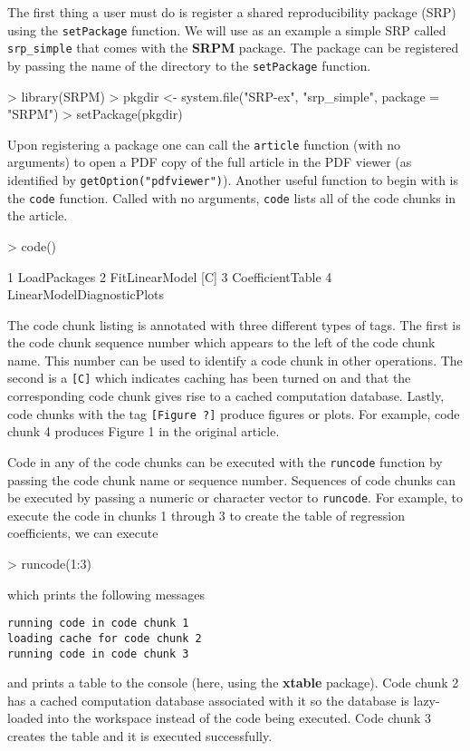 \documentclass{article}
\newcommand{\code}{\texttt}
\newcommand{\pkg}{\textbf}
\begin{document}
The first thing a user must do is register a shared reproducibility
package (SRP) using the \code{setPackage} function.  We will use as an
example a simple SRP called \code{srp\_simple} that comes with the
\pkg{SRPM} package.  The package can be registered by passing the name
of the directory to the \code{setPackage} function.
\begin{Schunk}
\begin{Sinput}
> library(SRPM)
> pkgdir <- system.file("SRP-ex", "srp_simple", package = "SRPM")
> setPackage(pkgdir)
\end{Sinput}
\end{Schunk}
Upon registering a package one can call the \code{article} function
(with no arguments) to open a PDF copy of the full article in the PDF
viewer (as identified by \code{getOption("pdfviewer")}).  Another
useful function to begin with is the \code{code} function.  Called
with no arguments, \code{code} lists all of the code chunks in the
article.
\begin{Schunk}
\begin{Sinput}
> code()
\end{Sinput}
\begin{Soutput}
1 LoadPackages  
2 FitLinearModel  [C]
3 CoefficientTable  
4 LinearModelDiagnosticPlots  
\end{Soutput}
\end{Schunk}

The code chunk listing is annotated with three different types of
tags.  The first is the code chunk sequence number which appears to
the left of the code chunk name.  This number can be used to identify
a code chunk in other operations.  The second is a \texttt{[C]} which
indicates caching has been turned on and that the corresponding code
chunk gives rise to a cached computation database.  Lastly, code
chunks with the tag \texttt{[Figure ?]} produce figures or plots.  For
example, code chunk 4 produces Figure 1 in the original article.


Code in any of the code chunks can be executed with the \code{runcode}
function by passing the code chunk name or sequence number.  Sequences
of code chunks can be executed by passing a numeric or character
vector to \code{runcode}.  For example, to execute the code in chunks
1 through 3 to create the table of regression coefficients, we can
execute
\begin{Schunk}
\begin{Sinput}
> runcode(1:3)
\end{Sinput}
\end{Schunk}
which prints the following messages
\begin{verbatim}
running code in code chunk 1
loading cache for code chunk 2
running code in code chunk 3
\end{verbatim}
and prints a table to the console (here, using the \pkg{xtable}
package).  Code chunk 2 has a cached computation database associated
with it so the database is lazy-loaded into the workspace instead of
the code being executed.  Code chunk 3 creates the table and it is
executed successfully.
\end{document}
